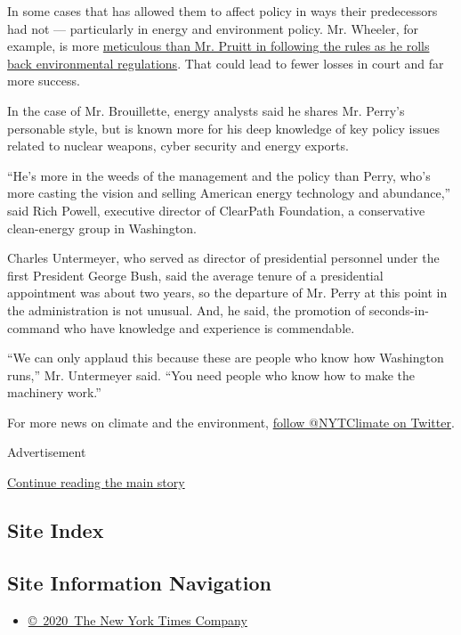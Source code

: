 In some cases that has allowed them to affect policy in ways their
predecessors had not --- particularly in energy and environment policy.
Mr. Wheeler, for example, is more
\href{https://www.nytimes.com/2018/11/21/climate/andrew-wheeler-epa.html}{meticulous
than Mr. Pruitt in following the rules as he rolls back environmental
regulations}. That could lead to fewer losses in court and far more
success.

In the case of Mr. Brouillette, energy analysts said he shares Mr.
Perry's personable style, but is known more for his deep knowledge of
key policy issues related to nuclear weapons, cyber security and energy
exports.

``He's more in the weeds of the management and the policy than Perry,
who's more casting the vision and selling American energy technology and
abundance,'' said Rich Powell, executive director of ClearPath
Foundation, a conservative clean-energy group in Washington.

Charles Untermeyer, who served as director of presidential personnel
under the first President George Bush, said the average tenure of a
presidential appointment was about two years, so the departure of Mr.
Perry at this point in the administration is not unusual. And, he said,
the promotion of seconds-in-command who have knowledge and experience is
commendable.

``We can only applaud this because these are people who know how
Washington runs,'' Mr. Untermeyer said. ``You need people who know how
to make the machinery work.''

For more news on climate and the environment,
\href{https://twitter.com/nytclimate}{follow @NYTClimate on Twitter}.

Advertisement

\protect\hyperlink{after-bottom}{Continue reading the main story}

\hypertarget{site-index}{%
\subsection{Site Index}\label{site-index}}

\hypertarget{site-information-navigation}{%
\subsection{Site Information
Navigation}\label{site-information-navigation}}

\begin{itemize}
\tightlist
\item
  \href{https://help.nytimes.com/hc/en-us/articles/115014792127-Copyright-notice}{©~2020~The
  New York Times Company}
\end{itemize}

